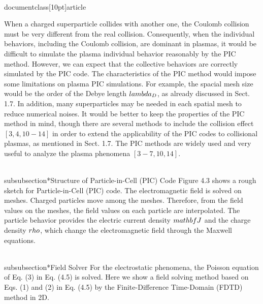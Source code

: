 \\documentclass[10pt]{article}
\begin{document}
{When a charged superparticle collides with another one, the Coulomb collision must be very different from the real collision. Consequently, when the individual behaviors, including the Coulomb collision, are dominant in plasmas, it would be difficult to simulate the plasma individual behavior reasonably by the PIC method. However, we can expect that the collective behaviors are correctly simulated by the PIC code. The characteristics of the PIC method would impose some limitations on plasma PIC simulations. For example, the spacial mesh size would be the order of the Debye length $\\lambda_{D}$, as already discussed in Sect. 1.7. In addition, many superparticles may be needed in each spatial mesh to reduce numerical noises. It would be better to keep the properties of the PIC method in mind, though there are several methods to include the collision effect $[3,4,10-14]$ in order to extend the applicability of the PIC codes to collisional plasmas, as mentioned in Sect. 1.7. The PIC methods are widely used and very useful to analyze the plasma phenomena $[3-7,10,14]$.

\\subsubsection*{Structure of Particle-in-Cell (PIC) Code}
Figure 4.3 shows a rough sketch for Particle-in-Cell (PIC) code. The electromagnetic field is solved on meshes. Charged particles move among the meshes. Therefore, from the field values on the meshes, the field values on each particle are interpolated. The particle behavior provides the electric current density $\\mathbf{J}$ and the charge density $\\rho$, which change the electromagnetic field through the Maxwell equations.

\\subsubsection*{Field Solver}
For the electrostatic phenomena, the Poisson equation of Eq. (3) in Eq. (4.5) is solved. Here we show a field solving method based on Eqs. (1) and (2) in Eq. (4.5) by the Finite-Difference Time-Domain (FDTD) method in 2D.

}
\end{document}
